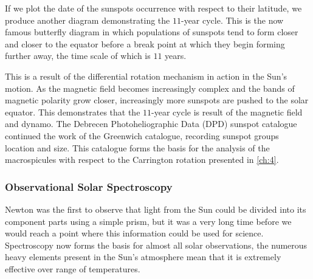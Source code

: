If we plot the date of the sunspots occurrence with respect to their latitude, we produce another diagram demonstrating the $11$-year cycle.
This is the now famous butterfly diagram in which populations of sunspots tend to form closer and closer to the equator before a break point at which they begin forming further away, the time scale of which is $11$ years.

This is a result of the differential rotation mechanism in action in the Sun's motion.
As the magnetic field becomes increasingly complex and the bands of magnetic polarity grow closer, increasingly more sunspots are pushed to the solar equator.
This demonstrates that the $11$-year cycle is result of the magnetic field and dynamo.
The Debrecen Photoheliographic Data (DPD) sunspot catalogue continued the work of the Greenwich catalogue, recording sunspot groups location and size.
This catalogue forms the basis for the analysis of the macrospicules with respect to the Carrington rotation presented in \cref{ch:4}.


\subsubsection{Observational Solar Spectroscopy}

Newton was the first to observe that light from the Sun could be divided into its component parts using a simple prism, but it was a very long time before we would reach a point where this information could be used for science.
Spectroscopy now forms the basis for almost all solar observations, the numerous heavy elements present in the Sun's atmosphere mean that it is extremely effective over range of temperatures.

